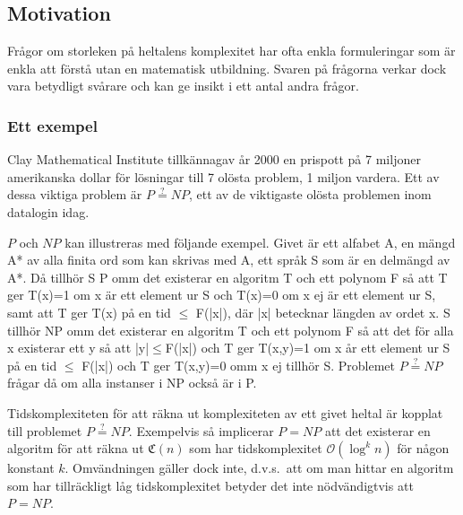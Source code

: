 \documentclass[a4paper,titlepage]{article}
\newcommand{\C}[1]{\mathfrak C \left( #1 \right)}
\renewcommand{\O}{\mathcal {O}}
\theoremstyle{definition}
\begin{document}
	  \subsection{Motivation}
	
	Frågor om storleken på heltalens komplexitet har ofta enkla formuleringar som är enkla att 	förstå utan en matematisk utbildning.
    Svaren på frågorna verkar dock vara betydligt svårare och kan ge insikt i ett antal andra frågor.	
	
	\subsubsection{Ett exempel}


	Clay Mathematical Institute tillkännagav år 2000 en prispott på 7 miljoner amerikanska dollar 	för lösningar till 7 olösta problem, 1 miljon vardera. Ett av dessa viktiga problem är $P \stackrel{?}{=} NP$, ett av de viktigaste olösta problemen inom datalogin idag.

		
	$P$ och $NP$ kan illustreras med följande exempel. 
	Givet är ett alfabet A,
	en mängd A* av alla finita ord som kan skrivas med A,
	ett språk S som är en delmängd av A*. Då
	tillhör S P omm det existerar en algoritm T och ett polynom F så att T ger T(x)=1 om x är ett element ur S och T(x)=0 om x ej är ett element ur S,
    samt att T ger T(x) på en tid 	$\le$ F(|x|), där |x| betecknar längden av ordet x.
	S tillhör NP omm det existerar en algoritm T och ett polynom F så att det för alla x existerar ett
    y så att |y|$\le$F(|x|) och T ger T(x,y)=1 om x år ett element ur S på en tid $\le$ F(|x|) och T
	ger T(x,y)=0 omm x ej tillhör S. Problemet $P \stackrel{?}{=} NP$ frågar då om alla instanser i NP också är i P.
    
    Tidskomplexiteten för att räkna ut komplexiteten av ett 
	givet heltal är kopplat till problemet $P \stackrel{?}{=} NP$.
    Exempelvis så implicerar $P = NP$ att det existerar en algoritm för
    att räkna ut $\C{n}$ som har tidskomplexitet $\O(\log^k n)$ 
    för någon konstant $k$. Omvändningen gäller dock inte, d.v.s.\
    att om man hittar en algoritm som har tillräckligt låg tidskomplexitet
    betyder det inte nödvändigtvis att $P=NP$.
	 
\end{document}
